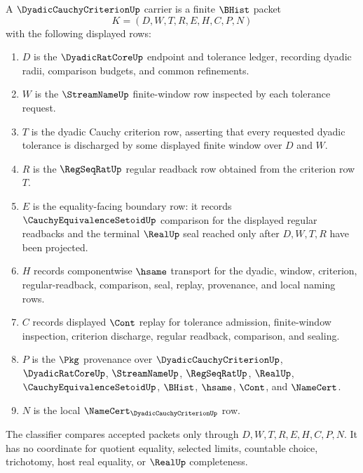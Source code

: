 \begin{definition}
\label{def:dyadic-cauchy-criterion-carrier}
A $\DyadicCauchyCriterionUp$ carrier is a finite $\BHist$ packet
$$
K=(D,W,T,R,E,H,C,P,N)
$$
with the following displayed rows:
\begin{enumerate}
\item $D$ is the $\DyadicRatCoreUp$ endpoint and tolerance ledger, recording dyadic radii, comparison budgets, and common refinements.
\item $W$ is the $\StreamNameUp$ finite-window row inspected by each tolerance request.
\item $T$ is the dyadic Cauchy criterion row, asserting that every requested dyadic tolerance is discharged by some displayed finite window over $D$ and $W$.
\item $R$ is the $\RegSeqRatUp$ regular readback row obtained from the criterion row $T$.
\item $E$ is the equality-facing boundary row: it records $\CauchyEquivalenceSetoidUp$ comparison for the displayed regular readbacks and the terminal $\RealUp$ seal reached only after $D,W,T,R$ have been projected.
\item $H$ records componentwise $\hsame$ transport for the dyadic, window, criterion, regular-readback, comparison, seal, replay, provenance, and local naming rows.
\item $C$ records displayed $\Cont$ replay for tolerance admission, finite-window inspection, criterion discharge, regular readback, comparison, and sealing.
\item $P$ is the $\Pkg$ provenance over $\DyadicCauchyCriterionUp$, $\DyadicRatCoreUp$, $\StreamNameUp$, $\RegSeqRatUp$, $\RealUp$, $\CauchyEquivalenceSetoidUp$, $\BHist$, $\hsame$, $\Cont$, and $\NameCert$.
\item $N$ is the local $\NameCert_{\DyadicCauchyCriterionUp}$ row.
\end{enumerate}
The classifier compares accepted packets only through $D,W,T,R,E,H,C,P,N$. It has no coordinate for quotient equality, selected limits, countable choice, trichotomy, host real equality, or $\RealUp$ completeness.
\end{definition}

